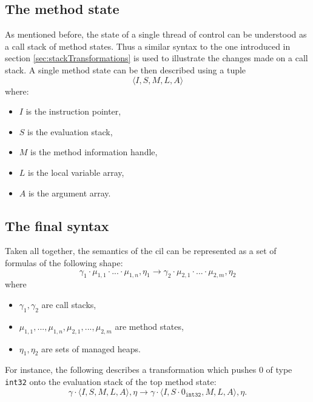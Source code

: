 \documentclass{article}
\numberwithin{equation}{section}
\newcommand{\mstate}[5] {
	\langle#1, #2, #3, #4, #5\rangle
}
\begin{document}
\subsection{The method state}

As mentioned before, the state of a single thread of control can be understood as a call stack of method states. Thus a similar syntax to the one introduced in section \ref{sec:stackTransformations} is used to illustrate the changes made on a call stack. A single method state can be then described using a tuple
\begin{equation}
\label{eq:methodState}
	\mstate{I}{S}{M}{L}{A}
\end{equation}
where:
\begin{itemize}
	\item{$I$ is the instruction pointer},
	\item{$S$ is the evaluation stack},
	\item{$M$ is the method information handle},
	\item{$L$ is the local variable array},
	\item{$A$ is the argument array}.
\end{itemize}

\subsection{The final syntax}

Taken all together, the semantics of the \acrshort{cil} can be represented as a set of formulas of the following shape:
\begin{equation}
\label{eq:finalSyntax}
	\gamma_1 \cdot \mu_{1,1} \cdot ... \cdot \mu_{1,n}, \eta_1 \rightarrow \gamma_2 \cdot \mu_{2,1} \cdot ... \cdot \mu_{2,m}, \eta_2
\end{equation}
where
\begin{itemize}
	\item{$\gamma_1, \gamma_2$ are call stacks,}
	\item{$\mu_{1,1}, ..., \mu_{1,n}, \mu_{2, 1}, ..., \mu_{2, m}$ are method states,}
	\item{$\eta_1, \eta_2$ are sets of managed heaps.}
\end{itemize}

For instance, the following describes a transformation which pushes 0 of type \texttt{int32} onto the evaluation stack of the top method state:
$$
	\gamma \cdot \mstate{I}{S}{M}{L}{A}, \eta \rightarrow \gamma \cdot \mstate{I}{S \cdot 0_\texttt{int32}}{M}{L}{A}, \eta.
$$
\end{document}
